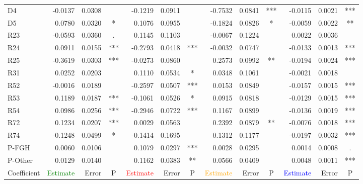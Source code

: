 \documentclass[11pt,letterpaper]{article}
\numberwithin{equation}{section}
\numberwithin{equation}{section}
\numberwithin{equation}{section}
\begin{document}
\begin{center}
\begin{table}
\begin{tabular}{|l|rrc|rrc|rrc|rrc|}
D4      & -0.0137 & 0.0308 &     & -0.1219 & 0.0911 &     & -0.7532 & 0.0841 & *** & -0.0115 & 0.0021 & *** \\
D5      & 0.0780  & 0.0320 & *   & 0.1076  & 0.0955 &     & -0.1824 & 0.0826 & *   & -0.0059 & 0.0022 & **  \\
R23     & -0.0593 & 0.0360 & .   & 0.1145  & 0.1103 &     & -0.0067 & 0.1224 &     & 0.0022  & 0.0036 &     \\
R24     & 0.0911  & 0.0155 & *** & -0.2793 & 0.0418 & *** & -0.0032 & 0.0747 &     & -0.0133 & 0.0013 & *** \\
R25     & -0.3619 & 0.0303 & *** & -0.0273 & 0.0860 &     & 0.2573  & 0.0992 & **  & -0.0194 & 0.0024 & *** \\
R31     & 0.0252  & 0.0203 &     & 0.1110  & 0.0534 & *   & 0.0348  & 0.1061 &     & -0.0021 & 0.0018 &     \\
R52     & -0.0016 & 0.0189 &     & -0.2597 & 0.0507 & *** & 0.0153  & 0.0849 &     & -0.0157 & 0.0015 & *** \\
R53     & 0.1189  & 0.0187 & *** & -0.1061 & 0.0526 & *   & 0.0915  & 0.0818 &     & -0.0129 & 0.0015 & *** \\
R54     & 0.0986  & 0.0256 & *** & -0.2946 & 0.0722 & *** & 0.1167  & 0.0899 &     & -0.0136 & 0.0019 & *** \\
R72     & 0.1234  & 0.0207 & *** & 0.0029  & 0.0563 &     & 0.2392  & 0.0879 & **  & -0.0076 & 0.0018 & *** \\
R74     & -0.1248 & 0.0499 & *   & -0.1414 & 0.1695 &     & 0.1312  & 0.1177 &     & -0.0197 & 0.0032 & *** \\
P-FGH   & 0.0060  & 0.0106 &     & 0.1079  & 0.0297 & *** & 0.0028  & 0.0295 &     & 0.0014  & 0.0008 & .   \\
P-Other & 0.0129  & 0.0140 &     & 0.1162  & 0.0383 & **  & 0.0566  & 0.0409 &     & 0.0048  & 0.0011 & *** \\
Coefficient & \textcolor{green}{Estimate} & Error    & P   & \textcolor{red}{Estimate} & Error    & P   & \textcolor{orange}{Estimate} & Error    & P   & \textcolor{blue}{Estimate}  & Error    & P   \\
\hline\hline
\end{tabular}
\end{table}


\end{center}
\end{document}
